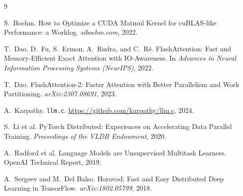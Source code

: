 \documentclass[11pt]{article}
\begin{document}
\begin{thebibliography}{9}

S.\ Boehm.
How to Optimize a CUDA Matmul Kernel for cuBLAS-like Performance: a Worklog.
\textit{siboehm.com}, 2022.

T.\ Dao, D.\ Fu, S.\ Ermon, A.\ Rudra, and C.\ R\'{e}.
FlashAttention: Fast and Memory-Efficient Exact Attention with IO-Awareness.
In \textit{Advances in Neural Information Processing Systems (NeurIPS)}, 2022.

T.\ Dao.
FlashAttention-2: Faster Attention with Better Parallelism and Work Partitioning.
\textit{arXiv:2307.08691}, 2023.

A.\ Karpathy.
\texttt{llm.c}.
\url{https://github.com/karpathy/llm.c}, 2024.

S.\ Li et al.
PyTorch Distributed: Experiences on Accelerating Data Parallel Training.
\textit{Proceedings of the VLDB Endowment}, 2020.

A.\ Radford et al.
Language Models are Unsupervised Multitask Learners.
OpenAI Technical Report, 2019.

A.\ Sergeev and M.\ Del Balso.
Horovod: Fast and Easy Distributed Deep Learning in TensorFlow.
\textit{arXiv:1802.05799}, 2018.

\end{thebibliography}
\end{document}
